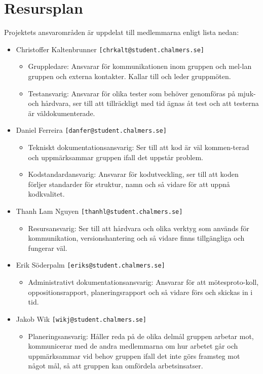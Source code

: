 \documentclass[a4paper]{article}
\begin{document}
\section{Resursplan}
\label{sec:resursplan}
Projektets ansvarområden är uppdelat till medlemmarna enligt lista nedan: 
\begin{itemize}
\item Christoffer Kaltenbrunner \texttt{[chrkalt@student.chalmers.se]} 
	\begin{itemize}
	\item Gruppledare: Ansvarar för kommunikationen inom gruppen och mel-lan gruppen och externa kontakter. Kallar till och leder gruppmöten.
	\item Testansvarig: Ansvarar för olika tester som behöver genomföras på mjuk- och hårdvara, ser till att tillräckligt med tid ägnas åt test och att testerna är väldokumenterade. 
	\end{itemize}
\item Daniel Ferreira \texttt{[danfer@student.chalmers.se]}
	\begin{itemize}
	\item Tekniskt dokumentationsansvarig: Ser till att kod är väl kommen-terad och uppmärksammar gruppen ifall det uppstår problem.
	\item Kodstandardansvarig: Ansvarar för kodutveckling, ser till att koden förljer standarder för struktur, namn och så vidare för att uppnå kodkvalitet.
	\end{itemize}
\item Thanh Lam Nguyen \texttt{[thanhl@student.chalmers.se]}
	\begin{itemize}
	\item Resursansvarig: Ser till att hårdvara och olika verktyg som används för kommunikation, versionshantering och så vidare finns tillgängliga och fungerar väl.
	\end{itemize}
\item Erik Söderpalm \texttt{[eriks@student.chalmers.se]}
	\begin{itemize}
	\item Administrativt dokumentationsansvarig: Ansvarar för att mötesproto-koll, oppositionsrapport, planeringsrapport och så vidare förs och skickas in i tid. 
	\end{itemize}
\item Jakob Wik \texttt{[wikj@student.chalmers.se]}
	\begin{itemize}
	\item Planeringsansvarig: Håller reda på de olika delmål gruppen arbetar mot, kommunicerar med de andra medlemmarna om hur arbetet går och uppmärksammar vid behov gruppen ifall det inte görs framsteg mot något mål, så att gruppen kan omfördela arbetsinsatser.
	\end{itemize}
\end{itemize}
\end{document}
